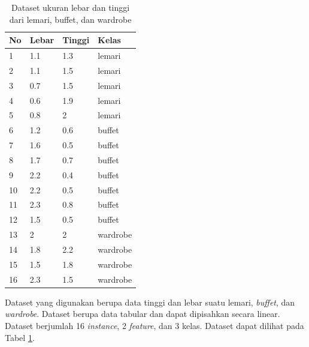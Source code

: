 \begin{table}[H]
    \centering
    \begin{tabular}{||p{1em}|p{3em}|p{3em}|p{4em}||}
    \hline
       No & Lebar & Tinggi & Kelas\\ [0.5ex]
        \hline\hline
        1 & 1.1 & 1.3 & lemari\\ \hline 
        2 & 1.1 & 1.5 & lemari\\ \hline	
        3 & 0.7 & 1.5 & lemari\\ \hline	
        4 & 0.6 & 1.9 & lemari\\ \hline	
        5 & 0.8 & 2 & lemari\\ \hline	
        6 & 1.2 & 0.6 & buffet\\ \hline	
        7 & 1.6 & 0.5 & buffet\\ \hline	
        8 & 1.7 & 0.7 & buffet\\ \hline	
        9 & 2.2 & 0.4 & buffet\\ \hline	
        10 & 2.2 & 0.5 & buffet\\ \hline	
        11 & 2.3 & 0.8 & buffet\\ \hline	
        12 & 1.5 & 0.5 & buffet\\ \hline
        13 & 2 & 2 & wardrobe\\ \hline
        14 & 1.8 & 2.2 & wardrobe\\ \hline	
        15 & 1.5 & 1.8 & wardrobe\\ \hline	
        16 & 2.3 & 1.5 & wardrobe\\ \hline
        \end{tabular}
    \caption{Dataset ukuran lebar dan tinggi dari lemari, buffet, dan wardrobe}
    \label{tab:Dataset}
\end{table}

Dataset yang digunakan berupa data tinggi dan lebar suatu lemari, \textit{buffet}, dan \textit{wardrobe}. Dataset berupa data tabular dan dapat dipisahkan secara linear. Dataset berjumlah 16 \textit{instance}, 2 \textit{feature}, dan 3 kelas. Dataset dapat dilihat pada Tabel \ref{tab:Dataset}.

